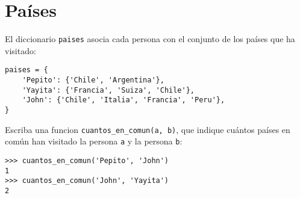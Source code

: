 \section{Países}

El diccionario \lstinline!paises! asocia cada persona con el conjunto de
los países que ha visitado:

\begin{lstlisting}
paises = {
    'Pepito': {'Chile', 'Argentina'},
    'Yayita': {'Francia', 'Suiza', 'Chile'},
    'John': {'Chile', 'Italia', 'Francia', 'Peru'},
}
\end{lstlisting}

Escriba una funcion \lstinline!cuantos_en_comun(a, b)!, que indique
cuántos países en común han visitado la persona \lstinline!a! y la
persona \lstinline!b!:

\begin{lstlisting}
>>> cuantos_en_comun('Pepito', 'John')
1
>>> cuantos_en_comun('John', 'Yayita')
2
\end{lstlisting}


